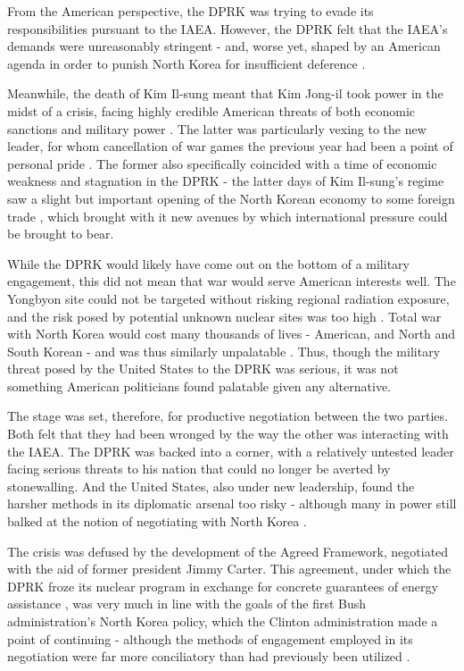 \documentclass{article}
\begin{document}
From the American perspective, the DPRK was trying to evade its responsibilities pursuant to the IAEA. However, the DPRK felt that the IAEA's demands were unreasonably stringent - and, worse yet, shaped by an American agenda in order to punish North Korea for insufficient deference \cite{cumings}.

Meanwhile, the death of Kim Il-sung meant that Kim Jong-il took power in the midst of a crisis, facing highly credible American threats of both economic sanctions and military power \cite{cerami}. The latter was particularly vexing to the new leader, for whom cancellation of war games the previous year had been a point of personal pride \cite{farrell}. The former also specifically coincided with a time of economic weakness and stagnation in the DPRK - the latter days of Kim Il-sung's regime saw a slight but important opening of the North Korean economy to some foreign trade \cite{sigal}, which brought with it new avenues by which international pressure could be brought to bear.

While the DPRK would likely have come out on the bottom of a military engagement, this did not mean that war would serve American interests well. The Yongbyon site could not be targeted without risking regional radiation exposure, and the risk posed by potential unknown nuclear sites was too high \cite{sigal}. Total war with North Korea would cost many thousands of lives - American, and North and South Korean - and was thus similarly unpalatable \cite{cumings}. Thus, though the military threat posed by the United States to the DPRK was serious, it was not something American politicians found palatable given any alternative.
	
The stage was set, therefore, for productive negotiation between the two parties. Both felt that they had been wronged by the way the other was interacting with the IAEA. The DPRK was backed into a corner, with a relatively untested leader facing serious threats to his nation that could no longer be averted by stonewalling. And the United States, also under new leadership, found the harsher methods in its diplomatic arsenal too risky - although many in power still balked at the notion of negotiating with North Korea \cite{harnisch}.

The crisis was defused by the development of the Agreed Framework, negotiated with the aid of former president Jimmy Carter. This agreement, under which the DPRK froze its nuclear program in exchange for concrete guarantees of energy assistance \cite{agreed}, was very much in line with the goals of the first Bush administration's North Korea policy, which the Clinton administration made a point of continuing \cite{cerami} - although the methods of engagement employed in its negotiation were far more conciliatory than had previously been utilized \cite{sigal}.
\end{document}
